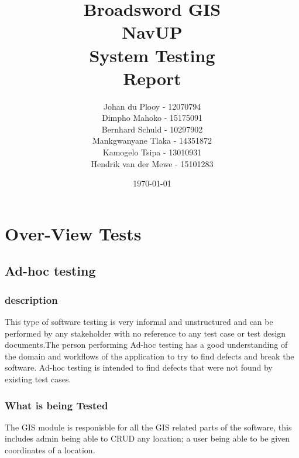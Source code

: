 \documentclass[12pt]{article}
\begin{document}
\title{\Huge Broadsword GIS \\ NavUP \\ System Testing \\ Report}
\author{\Large Johan du Plooy - 12070794 \\
		\Large Dimpho Mahoko - 15175091 \\
		\Large Bernhard Schuld - 10297902 \\
		\Large Mankgwanyane Tlaka - 14351872 \\
		\Large Kamogelo Tsipa - 13010931 \\
		\Large Hendrik van der Mewe - 15101283}
\date{\today}
\maketitle

\newpage
\tableofcontents
\newpage


\section{Over-View Tests}
	
	\subsection{Ad-hoc testing}
		\subsubsection{description}
		This type of software testing is very informal and unstructured and can be performed by any stakeholder with no 			reference to 	any test case or test design documents.The person performing Ad-hoc testing has a good understanding of 		the domain and workflows of the application to try to find defects and break the software. Ad-hoc testing is intended to 		 find defects that were not found by existing test cases.
		
		\subsubsection{What is being Tested}
		The GIS module is responisble for all the GIS related parts of the software, this includes admin being able to CRUD any 
		location; a user being able to be given coordinates of a location.
		
\end{document}
